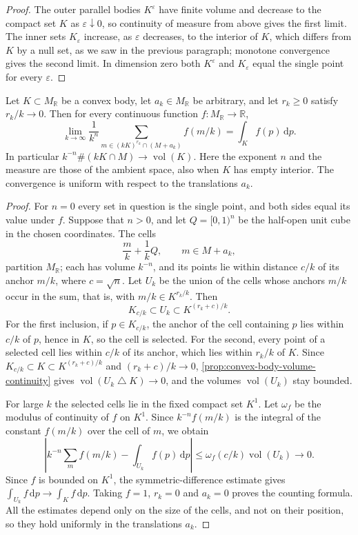 \begin{proof}
The outer parallel bodies $K^\varepsilon$ have finite volume and decrease to the compact set $K$ as $\varepsilon\downarrow0$, so continuity of measure from above gives the first limit. The inner sets $K_\varepsilon$ increase, as $\varepsilon$ decreases, to the interior of $K$, which differs from $K$ by a null set, as we saw in the previous paragraph; monotone convergence gives the second limit. In dimension zero both $K^\varepsilon$ and $K_\varepsilon$ equal the single point for every $\varepsilon$.
\end{proof}

\begin{theorem}\label{thm:convex-body-lattice-riemann-sums}
Let $K\subset M_{\mathbb R}$ be a convex body, let $a_k\in M_{\mathbb R}$ be arbitrary, and let $r_k\geq0$ satisfy $r_k/k\to0$. Then for every continuous function $f\colon M_{\mathbb R}\to\mathbb R$,
\[
 \lim_{k\to\infty}\frac1{k^n}
       \sum_{m\in (kK)^{r_k}\cap(M+a_k)}f(m/k)
                         =\int_K f(p)\,\mathrm dp.
\]
In particular $k^{-n}\#(kK\cap M)\to\operatorname{vol}(K)$. Here the exponent $n$ and the measure are those of the ambient space, also when $K$ has empty interior. The convergence is uniform with respect to the translations $a_k$.
\end{theorem}
\begin{proof}
For $n=0$ every set in question is the single point, and both sides equal its value under $f$. Suppose that $n>0$, and let $Q=[0,1)^n$ be the half-open unit cube in the chosen coordinates. The cells
\[
 \frac mk+\frac1k Q,\qquad m\in M+a_k,
\]
partition $M_{\mathbb R}$; each has volume $k^{-n}$, and its points lie within distance $c/k$ of its anchor $m/k$, where $c=\sqrt n$. Let $U_k$ be the union of the cells whose anchors $m/k$ occur in the sum, that is, with $m/k\in K^{r_k/k}$. Then
\[
 K_{c/k}\subset U_k\subset K^{(r_k+c)/k}.
\]
For the first inclusion, if $p\in K_{c/k}$, the anchor of the cell containing $p$ lies within $c/k$ of $p$, hence in $K$, so the cell is selected. For the second, every point of a selected cell lies within $c/k$ of its anchor, which lies within $r_k/k$ of $K$. Since $K_{c/k}\subset K\subset K^{(r_k+c)/k}$ and $(r_k+c)/k\to0$, \cref{prop:convex-body-volume-continuity} gives $\operatorname{vol}(U_k\mathbin\triangle K)\to0$, and the volumes $\operatorname{vol}(U_k)$ stay bounded.

For large $k$ the selected cells lie in the fixed compact set $K^1$. Let $\omega_f$ be the modulus of continuity of $f$ on $K^1$. Since $k^{-n}f(m/k)$ is the integral of the constant $f(m/k)$ over the cell of $m$, we obtain
\[
 \left|k^{-n}\sum_m f(m/k)-\int_{U_k}f(p)\,\mathrm dp\right|
            \leq\omega_f(c/k)\operatorname{vol}(U_k)\longrightarrow0.
\]
Since $f$ is bounded on $K^1$, the symmetric-difference estimate gives $\int_{U_k}f\,\mathrm dp\to\int_Kf\,\mathrm dp$. Taking $f=1$, $r_k=0$ and $a_k=0$ proves the counting formula. All the estimates depend only on the size of the cells, and not on their position, so they hold uniformly in the translations $a_k$.
\end{proof}

